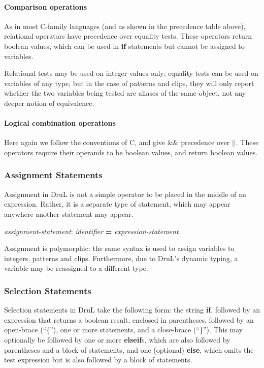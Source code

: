 \paragraph{Comparison operations}

As in most C-family languages (and as shown in the precedence table above), relational operators have precedence over equality tests.  These operators return boolean values, which can be used in \textbf{if} statements but cannot be assigned to variables.

Relational tests may be used on integer values only; equality tests can be used on variables of any type, but in the case of patterns and clips, they will only report whether the two variables being tested are  aliases of the same object, not any deeper notion of equivalence.

\paragraph{Logical combination operations}

Here again we follow the conventions of C, and give $\&\&$ precedence over $||$.  These operators require their operands to be boolean values, and return boolean values.

\subsubsection{Assignment Statements}

Assignment in DruL is not a simple operator to be placed in the middle of an expression.  Rather, it is a separate type of statement, which may appear anywhere another statement may appear.

\begin{center}
\emph{assignment-statement}: \emph{identifier} \textbf{=}  \emph{expression-statement}
\end{center}

Assignment is polymorphic: the same syntax is used to assign variables to
integers, patterns and clips. Furthermore, due to DruL's dynamic typing,
a variable may be reassigned to a different type.

\subsubsection{Selection Statements}

Selection statements in DruL take the following form: the string \textbf{if}, followed by an expression that returns a boolean result, enclosed in parentheses, followed by an open-brace (``\{''), one or more statements, and a close-brace (``\}'').  This may optionally be followed by one or more \textbf{elseif}s, which are also followed by parentheses and a block of statements, and one (optional) \textbf{else}, which omits the test expression but is also followed by a block of statements.

